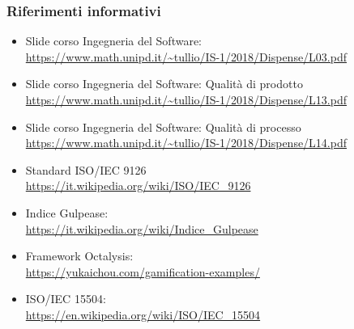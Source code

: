     \subsubsection{Riferimenti informativi}
    \begin{itemize}
        \item Slide corso Ingegneria del Software:
        \\ \url{https://www.math.unipd.it/~tullio/IS-1/2018/Dispense/L03.pdf}
        \item Slide corso Ingegneria del Software: Qualità di prodotto
        \\ \url{https://www.math.unipd.it/~tullio/IS-1/2018/Dispense/L13.pdf}
        \item Slide corso Ingegneria del Software: Qualità di processo
        \\ \url{https://www.math.unipd.it/~tullio/IS-1/2018/Dispense/L14.pdf}
        \item Standard ISO/IEC 9126
        \\ \url{https://it.wikipedia.org/wiki/ISO/IEC_9126}
        \item Indice Gulpease:
        \\ \url{https://it.wikipedia.org/wiki/Indice_Gulpease}
        \item Framework Octalysis:
        \\ \url{https://yukaichou.com/gamification-examples/}
        \item ISO/IEC 15504:
        \\ \url{https://en.wikipedia.org/wiki/ISO/IEC_15504}
        
    \end{itemize}
    
    